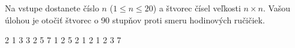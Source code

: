 




Na vstupe dostanete číslo $n$ ($1\leq n \leq 20$) a štvorec čísel veľkosti $n\times n$. Vašou úlohou je
otočiť štvorec o 90 stupňov proti smeru hodinových ručičiek.

2 1 3 
3 2 5 
7 1 2 
 5 2
1 2 1
2 3 7
\koniec


